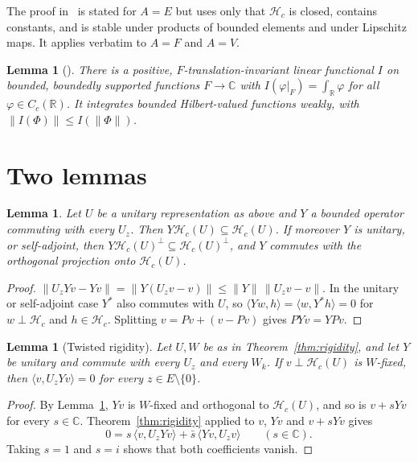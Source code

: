 \documentclass[11pt]{amsart}
\newtheorem{lemma}[theorem]{Lemma}
\theoremstyle{definition}
\newcommand{\R}{\mathbb{R}}
\newcommand{\C}{\mathbb{C}}
\newcommand{\cH}{\mathcal{H}}
\begin{document}
The proof in~\cite{OAI} is stated for $A=E$ but uses only that $\cH_c$ is closed, contains constants, and is stable under products of bounded elements and under Lipschitz maps. It applies verbatim to $A=F$ and $A=V$.

\begin{lemma}[{\cite[\S2.2]{OAI}}]\label{lem:mean}
There is a positive, $F$-translation-invariant linear functional $I$ on bounded, boundedly supported functions $F\to\C$ with $I(\varphi|_F)=\int_\R\varphi$ for all $\varphi\in C_c(\R)$. It integrates bounded Hilbert-valued functions weakly, with $\|I(\Phi)\|\le I(\|\Phi\|)$.
\end{lemma}

\section{Two lemmas}

\begin{lemma}\label{lem:comm}
Let $U$ be a unitary representation as above and $Y$ a bounded operator commuting with every $U_z$. Then $Y\cH_c(U)\subseteq\cH_c(U)$. If moreover $Y$ is unitary, or self-adjoint, then $Y\cH_c(U)^\perp\subseteq\cH_c(U)^\perp$, and $Y$ commutes with the orthogonal projection onto $\cH_c(U)$.
\end{lemma}

\begin{proof}
$\|U_zYv-Yv\|=\|Y(U_zv-v)\|\le\|Y\|\,\|U_zv-v\|$. In the unitary or self-adjoint case $Y^*$ also commutes with $U$, so $\langle Yw,h\rangle=\langle w,Y^*h\rangle=0$ for $w\perp\cH_c$ and $h\in\cH_c$. Splitting $v=Pv+(v-Pv)$ gives $PYv=YPv$.
\end{proof}

\begin{lemma}[Twisted rigidity]\label{lem:twisted}
Let $U,W$ be as in Theorem~\ref{thm:rigidity}, and let $Y$ be unitary and commute with every $U_z$ and every $W_k$. If $v\perp\cH_c(U)$ is $W$-fixed, then $\langle v,U_zYv\rangle=0$ for every $z\in E\setminus\{0\}$.
\end{lemma}

\begin{proof}
By Lemma~\ref{lem:comm}, $Yv$ is $W$-fixed and orthogonal to $\cH_c(U)$, and so is $v+sYv$ for every $s\in\C$. Theorem~\ref{thm:rigidity} applied to $v$, $Yv$ and $v+sYv$ gives
\[
0=s\,\langle v,U_zYv\rangle+\bar s\,\langle Yv,U_zv\rangle\qquad(s\in\C).
\]
Taking $s=1$ and $s=i$ shows that both coefficients vanish.
\end{proof}
\end{document}
